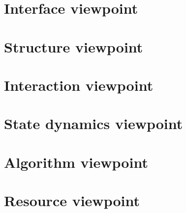 \documentclass{scrreprt}
\begin{document}
\section{Interface viewpoint}

\section{Structure viewpoint}

\section{Interaction viewpoint}

\section{State dynamics viewpoint}

\section{Algorithm viewpoint}

\section{Resource viewpoint}
\end{document}
